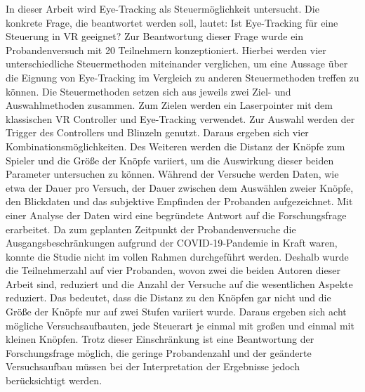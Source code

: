 In dieser Arbeit wird Eye-Tracking als Steuermöglichkeit untersucht. Die konkrete Frage, die beantwortet werden soll, lautet: \glqq Ist Eye-Tracking für eine Steuerung in \ac{VR} geeignet?\grqq{} Zur Beantwortung dieser Frage wurde ein Probandenversuch mit 20 Teilnehmern konzeptioniert. Hierbei werden vier unterschiedliche Steuermethoden miteinander verglichen, um eine Aussage über die Eignung von Eye-Tracking im Vergleich zu anderen Steuermethoden treffen zu können. Die Steuermethoden setzen sich aus jeweils zwei Ziel- und Auswahlmethoden zusammen. Zum Zielen werden ein Laserpointer mit dem klassischen \ac{VR} Controller und Eye-Tracking verwendet. Zur Auswahl werden der Trigger des Controllers und Blinzeln genutzt. Daraus ergeben sich vier Kombinationsmöglichkeiten. Des Weiteren werden die Distanz der Knöpfe zum Spieler und die Größe der Knöpfe variiert, um die Auswirkung dieser beiden Parameter untersuchen zu können. Während der Versuche werden Daten, wie etwa der Dauer pro Versuch, der Dauer zwischen dem Auswählen zweier Knöpfe, den Blickdaten und das subjektive Empfinden der Probanden aufgezeichnet. Mit einer Analyse der Daten wird eine begründete Antwort auf die Forschungsfrage erarbeitet. Da zum geplanten Zeitpunkt der Probandenversuche die Ausgangsbeschränkungen aufgrund der \ac{COVID-19}-Pandemie in Kraft waren, konnte die Studie nicht im vollen Rahmen durchgeführt werden. Deshalb wurde die Teilnehmerzahl auf vier Probanden, wovon zwei die beiden Autoren dieser Arbeit sind, reduziert und die Anzahl der Versuche auf die wesentlichen Aspekte reduziert. Das bedeutet, dass die Distanz zu den Knöpfen gar nicht und die Größe der Knöpfe nur auf zwei Stufen variiert wurde. Daraus ergeben sich acht mögliche Versuchsaufbauten, jede Steuerart je einmal mit großen und einmal mit kleinen Knöpfen. Trotz dieser Einschränkung ist eine Beantwortung der Forschungsfrage möglich, die geringe Probandenzahl und der geänderte Versuchsaufbau müssen bei der Interpretation der Ergebnisse jedoch berücksichtigt werden. 
